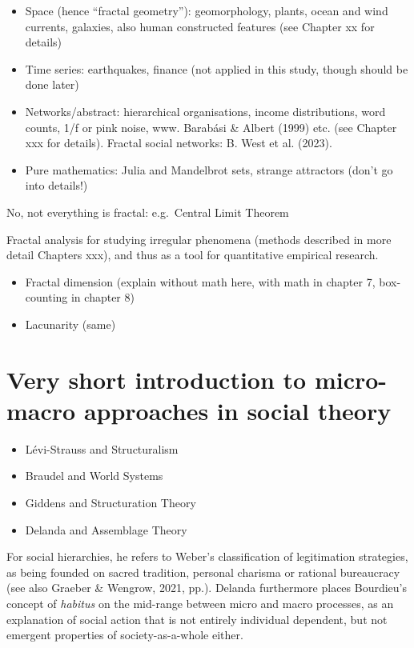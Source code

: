 \documentclass[
  12pt,
]{book}
\begin{document}
\begin{itemize}
\item
  Space (hence ``fractal geometry''): geomorphology, plants, ocean and wind currents, galaxies, also human constructed features (see Chapter xx for details)
\item
  Time series: earthquakes, finance (not applied in this study, though should be done later)
\item
  Networks/abstract: hierarchical organisations, income distributions, word counts, 1/f or pink noise, www. Barabási \& Albert (1999) etc. (see Chapter xxx for details). Fractal social networks: B. West et al. (2023).
\item
  Pure mathematics: Julia and Mandelbrot sets, strange attractors (don't go into details!)
\end{itemize}

No, not everything is fractal: e.g.~Central Limit Theorem

Fractal analysis for studying irregular phenomena (methods described in more detail Chapters xxx), and thus as a tool for quantitative empirical research.

\begin{itemize}
\item
  Fractal dimension (explain without math here, with math in chapter 7, box-counting in chapter 8)
\item
  Lacunarity (same)
\end{itemize}

\hypertarget{very-short-introduction-to-micro-macro-approaches-in-social-theory}{%
\section{Very short introduction to micro-macro approaches in social theory}\label{very-short-introduction-to-micro-macro-approaches-in-social-theory}}

\begin{itemize}
\item
  Lévi-Strauss and Structuralism
\item
  Braudel and World Systems
\item
  Giddens and Structuration Theory
\item
  Delanda and Assemblage Theory
\end{itemize}

For social hierarchies, he refers to Weber's classification of legitimation strategies, as being founded on sacred tradition, personal charisma or rational bureaucracy (see also Graeber \& Wengrow, 2021, pp.). Delanda furthermore places Bourdieu's concept of \emph{habitus} on the mid-range between micro and macro processes, as an explanation of social action that is not entirely individual dependent, but not emergent properties of society-as-a-whole either.
\end{document}
